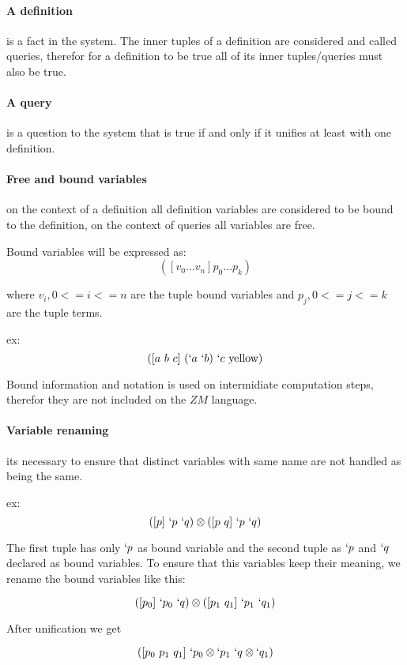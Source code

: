 \documentclass[11pt,a4paper]{report}
\newcommand{\zm}{ZM}
\newcommand{\var}[1]{`#1}
\newcommand{\unify}{\otimes}
\begin{document}
\paragraph{A definition} is a fact in the system. The inner tuples of a definition are considered and called queries, therefor
for a definition to be true all of its inner tuples/queries must also be true.

\paragraph{A query} is a question to the system that is true if and only if it unifies at least with
one definition.

\paragraph{Free and bound variables} on the context of a definition all definition variables are considered
to be bound to the definition, on the context of queries all variables are free.

Bound variables will be expressed as:
\[
    ([v_{0} \ldots v_{n}] p_{0} \ldots p_{k})
\]

where $v_{i}, 0 <= i <= n$ are the tuple bound variables and $p_{j}, 0 <= j <=k$ are the tuple terms.

ex:
\[
    ([a\ b\ c]\ (\var{a}\ \var{b})\ \var{c}\ \text{yellow})
\]

Bound information and notation is used on intermidiate computation steps, therefor they are not included on the $\zm$ language.


\paragraph{Variable renaming} its necessary to ensure that distinct variables with same name are not handled as being the same.

ex:
\[
    ([p]\ \var{p}\ \var{q}) \unify ([p\ q]\ \var{p}\ \var{q})
\]

The first tuple has only $\var{p}$ as bound variable and the second tuple as $\var{p}$ and $\var{q}$ declared as bound variables.
To ensure that this variables keep their meaning, we rename the bound variables like this:

\[
    ([p_{0}]\ \var{p_{0}}\ \var{q}) \unify ([p_{1}\ q_{1}]\ \var{p_{1}}\ \var{q_{1}})
\]

After unification we get

\[
    ([p_{0}\ p_{1}\ q_{1}]\ \var{p_{0}} \unify \var{p_{1}}\ \var{q} \unify \var{q_{1}})
\]
\end{document}

